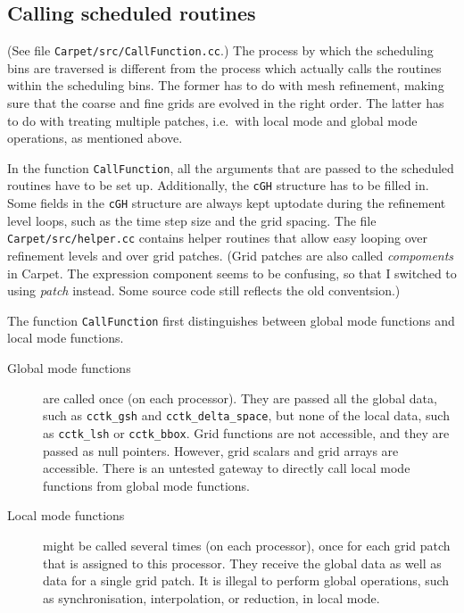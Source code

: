 \documentclass{article}
\begin{document}
\subsection{Calling scheduled routines}

   (See file \texttt{Carpet/src/CallFunction.cc}.)  The process by
   which the scheduling bins are traversed is different from the
   process which actually calls the routines within the scheduling
   bins.  The former has to do with mesh refinement, making sure that
   the coarse and fine grids are evolved in the right order.  The
   latter has to do with treating multiple patches, i.e.\ with local
   mode and global mode operations, as mentioned above.

   In the function \texttt{CallFunction}, all the arguments that are
   passed to the scheduled routines have to be set up.  Additionally,
   the \texttt{cGH} structure has to be filled in.  Some fields in the
   \texttt{cGH} structure are always kept uptodate during the
   refinement level loops, such as the time step size and the grid
   spacing.  The file \texttt{Carpet/src/helper.cc} contains helper
   routines that allow easy looping over refinement levels and over
   grid patches.  (Grid patches are also called \emph{compoments} in
   Carpet.  The expression component seems to be confusing, so that I
   switched to using \emph{patch} instead.  Some source code still
   reflects the old conventsion.)

   The function \texttt{CallFunction} first distinguishes between
   global mode functions and local mode functions.
\begin{description}
\item[Global mode functions]
   are called once (on each processor).  They are passed all the
   global data, such as \texttt{cctk\_gsh} and
   \texttt{cctk\_delta\_space}, but none of the local data, such as
   \texttt{cctk\_lsh} or \texttt{cctk\_bbox}.  Grid functions are not
   accessible, and they are passed as null pointers.  However, grid
   scalars and grid arrays are accessible.  There is an untested
   gateway to directly call local mode functions from global mode
   functions.
\item[Local mode functions]
   might be called several times (on each processor), once for each
   grid patch that is assigned to this processor.  They receive the
   global data as well as data for a single grid patch.  It is illegal
   to perform global operations, such as synchronisation,
   interpolation, or reduction, in local mode.
\end{description}
\end{document}
